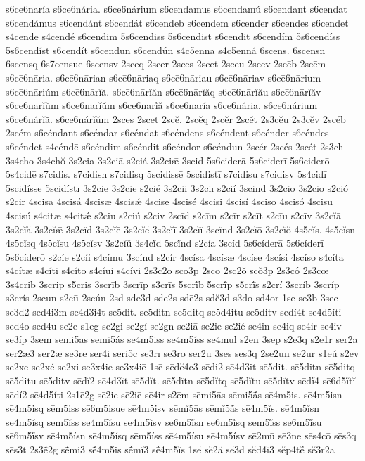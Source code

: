 {s6ce6naría
s6ce6nária.
s6ce6nárium
s6cendamus
s6cendamú
s6cendant
s6cendat
s6cendámus
s6cendánt
s6cendát
s6cendeb
s6cendem
s6cender
s6cendes
s6cendet
s4cendē
s4cendé
s6cendim
5s6cendiss
5s6cendist
s6cendit
s6cendím
5s6cendíss
5s6cendíst
s6cendít
s6cendun
s6cendún
s4c5enna
s4c5enná
6scens.
6scensn
6scensq
6s7censue
6scensv
2sceq
2scer
2sces
2scet
2sceu
2scev
2scēb
2scēm
s6cē6nāria.
s6cē6nārian
s6cē6nāriaq
s6cē6nāriau
s6cē6nāriav
s6cē6nārium
s6cē6nāriúm
s6cē6nārĭă.
s6cē6nārĭăn
s6cē6nārĭăq
s6cē6nārĭău
s6cē6nārĭăv
s6cē6nārĭŭm
s6cē6nārĭŭ́m
s6cē6nārĭ́ă
s6cē6nāría
s6cē6nā́ria.
s6cē6nā́rium
s6cē6nā́rĭă.
s6cē6nā́rĭŭm
2scēs
2scēt
2scĕ.
2scĕq
2scĕr
2scĕt
2s3cĕu
2s3cĕv
2scéb
2scém
s6céndant
s6céndar
s6céndat
s6céndens
s6céndent
s6cénder
s6céndes
s6céndet
s4céndē
s6céndim
s6céndit
s6céndor
s6céndun
2scér
2scés
2scét
2s3ch
3s4cho
3s4chŏ
3s2cia
3s2ciā
s2ciá
3s2ciǣ
3scid
5s6ciderā
5s6ciderī
5s6ciderō
5s4cidē
s7cidis.
s7cidisn
s7cidisq
5scidissē
5scidistī
s7cidisu
s7cidisv
5s4cidī
5scidíssē
5scidístī
3s2cie
3s2ciē
s2cié
3s2cii
3s2ciī
s2cií
3scind
3s2cio
3s2ciō
s2ció
s2cir
4scisa
4scisá
4scisæ
4scisǽ
4scise
4scisé
4scisi
4scisí
4sciso
4scisó
4scisu
4scisú
s4citæ
s4citǽ
s2ciu
s2ciú
s2civ
2scīd
s2cīm
s2cīr
s2cīt
s2cīu
s2cīv
3s2cĭā
3s2cĭă
3s2cĭǣ
3s2cĭd
3s2cĭē
3s2cĭĕ
3s2cĭī
3s2cĭĭ
3scĭnd
3s2cĭō
3s2cĭŏ
4s5cĭs.
4s5cĭsn
4s5cĭsq
4s5cĭsu
4s5cĭsv
3s2cĭŭ
3s4cĭ́d
5scĭ́nd
s2cía
3scíd
5s6cíderā
5s6cíderī
5s6cíderō
s2cíe
s2cíi
s4címu
3scínd
s2cír
4scísa
4scísæ
4scíse
4scísi
4scíso
s4cíta
s4cítæ
s4cíti
s4cíto
s4cíui
s4cívi
2s3c2o
sco3p
2scō
2sc2ŏ
scŏ3p
2s3có
2s3cœ
3s4crib
3scrip
s5cris
3scrīb
3scrīp
s3crīs
5scrī́b
5scrī́p
s5crī́s
s2crí
3scríb
3scríp
s3crís
2scun
s2cū
2scún
2sd
sde3d
sde2s
sdē2s
sdĕ3d
s3do
sd4or
1se
se3b
3sec
se3d2
sed4i3m
se4d3i4t
se5dit.
se5ditn
se5ditq
se5d4itu
se5ditv
sedí4t
se4d5íti
sed4o
sed4u
se2e
s1eg
se2gi
se2gí
se2gn
se2iā
se2ie
se2ié
se4in
se4iq
se4ir
se4iv
se3íp
3sem
semi5as
semi5ás
se4m5iss
se4m5íss
se4mul
s2en
3sep
s2e3q
s2e1r
ser2a
ser2æ3
ser2ǣ
se3rē
ser4i
seri5c
se3rī
se3rō
ser2u
3ses
ses3q
2se2un
se2ur
s1eú
s2ev
se2xe
se2xé
se2xi
se3x4ie
se3x4iē
1sē
sēdĕ4c3
sēdi2
sē4d3it
sē5dit.
sē5ditn
sē5ditq
sē5ditu
sē5ditv
sēdĭ2
sē4d3ĭt
sē5dĭt.
sē5dĭtn
sē5dĭtq
sē5dĭtu
sē5dĭtv
sēdĭ́4
sē6d5ĭ́tĭ
sēdí2
sē4d5íti
2s1ē2g
sē2ie
sē2iē
sē4ir
s2ēm
sēmi5ās
sēmi5ā́s
sē4m5is.
sē4m5isn
sē4m5isq
sēm5iss
sē6m5isue
sē4m5isv
sēmĭ5ās
sēmĭ5ā́s
sē4m5ĭs.
sē4m5ĭsn
sē4m5ĭsq
sēm5ĭss
sē4m5ĭsu
sē4m5ĭsv
sē6m5ĭ́sn
sē6m5ĭ́sq
sēm5ĭ́ss
sē6m5ĭ́su
sē6m5ĭ́sv
sē4m5ísn
sē4m5ísq
sēm5íss
sē4m5ísu
sē4m5ísv
sē2mū
sē3ne
sēs4cō
sēs3q
sēs3t
2s3ḗ2g
sḗmi3
sḗ4m5is
sḗmĭ3
sḗ4m5ĭs
1sĕ
sĕ2ă
sĕ3d
sĕd4ĭ3
sĕp4tĕ́
sĕ3r2a
}
